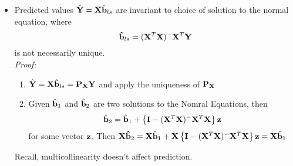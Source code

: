 \begin{itemize}
	{\it Proof:}
	\begin{pf}
		$$
		\vecc{X}\transpose\vecc{X} (\vecc{X}\transpose\vecc{X})^- \vecc{X}\transpose\vecc{X} = \vecc{X}\transpose\vecc{X} \vecc{I}
		$$
		with the above proposition, we have
		$$
		\vecc{X} (\vecc{X}\transpose\vecc{X})^- \vecc{X}\transpose\vecc{X} = \vecc{X}
		$$
		which is $\vecc{P_X X = X}$.
	\end{pf}
	\item Predicted values $\hat{\mathbf{Y}} = \mathbf{X}\hat{\mathbf{b}}_{ls}$ are invariant to choice of solution to the normal equation, where
	$$
	\mathbf{\hat{b}}_{ls} = (\mathbf{X}^T \mathbf{X})^- \mathbf{X}^T\mathbf{Y}
	$$
	is not necessarily unique.\\
	{\it Proof:}
	\begin{pf}
		\begin{enumerate}
			\item $\hat{\mathbf{Y}} = \mathbf{X\hat{b}}_{ls} = \mathbf{P_X Y}$ and apply the uniqueness of $\mathbf{P_X}$
			\item Given $\hat{\mathbf{b}}_1$ and $\hat{\mathbf{b}}_2$ are two solutions to the Nomral Equations, then
			$$
			\hat{\mathbf{b}}_2 = \hat{\mathbf{b}}_1 + \left\{ \mathbf{I} - (\mathbf{X}^T \mathbf{X})^- \mathbf{X}^T \mathbf{X}\right\} \mathbf{z}
			$$
			for some vector $\mathbf{z}$.
			Then $\mathbf{X\hat{b}}_2 = \mathbf{X}\hat{\mathbf{b}}_1 + \mathbf{X}\left\{ \mathbf{I} - (\mathbf{X}^T \mathbf{X})^- \mathbf{X}^T \mathbf{X}\right\} \mathbf{z} =  \mathbf{X}\hat{\mathbf{b}}_1$
		\end{enumerate}
		Recall, multicollinearity doesn't affect prediction.
	\end{pf}
\end{itemize}

